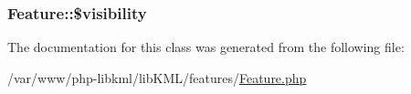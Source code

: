 \label{d5/d74/classFeature_abff79fd8c7eb59df7883dc60f814ac98}
\hypertarget{classFeature_a2967cfe3dc59926eda49da5a1ddbb604}{
\subsubsection[{\$visibility}]{\setlength{\rightskip}{0pt plus 5cm}Feature::\$visibility}}
\label{d5/d74/classFeature_a2967cfe3dc59926eda49da5a1ddbb604}


The documentation for this class was generated from the following file:\begin{DoxyCompactItemize}
\item 
/var/www/php-\/libkml/libKML/features/\hyperlink{Feature_8php}{Feature.php}\end{DoxyCompactItemize}
